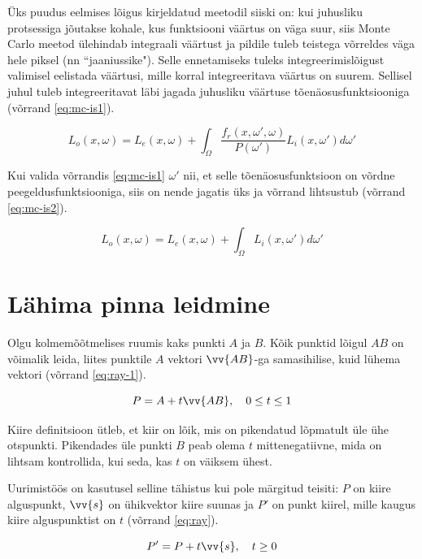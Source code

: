 \documentclass[a4paper,12pt]{report}
\renewcommand{\vec}[1]{\vv{#1}}
\begin{document}
Üks puudus eelmises lõigus kirjeldatud meetodil siiski on: kui juhusliku
protsessiga jõutakse kohale, kus funktsiooni väärtus on väga suur, siis
Monte Carlo meetod ülehindab integraali väärtust ja pildile tuleb teistega
võrreldes väga hele piksel (nn ``jaaniussike"). Selle ennetamiseks tuleks
integreerimislõigust valimisel eelistada väärtusi, mille korral
integreeritava väärtus on suurem. Sellisel juhul tuleb integreeritavat
läbi jagada juhusliku väärtuse tõenäosusfunktsiooniga (võrrand \ref{eq:mc-is1}).

\begin{equation} \label{eq:mc-is1}
L_o(x, \omega) = L_e(x, \omega) + \int_\Omega \frac{f_r(x, \omega', \omega)}{P(\omega')} L_i(x, \omega') d\omega'
\end{equation}

Kui valida võrrandis \ref{eq:mc-is1} \(\omega'\) nii, et selle
tõenäosusfunktsioon on võrdne peegeldus\-funktsiooniga, siis on nende
jagatis üks ja võrrand lihtsustub (võrrand \ref{eq:mc-is2}).

\begin{equation} \label{eq:mc-is2}
L_o(x, \omega) = L_e(x, \omega) + \int_\Omega L_i(x, \omega') d\omega'
\end{equation}

\section{Lähima pinna leidmine}
Olgu kolmemõõtmelises ruumis kaks punkti \(A\) ja \(B\). Kõik punktid
lõigul \(AB\) on võimalik leida, liites punktile \(A\) vektori \(\vec{AB}\)-ga
samasihilise, kuid lühema vektori (võrrand \ref{eq:ray-1}).

\begin{equation} \label{eq:ray-1}
P = A + t\vec{AB}, \quad 0 \leq t \leq 1
\end{equation}

Kiire definitsioon ütleb, et kiir on lõik, mis on pikendatud lõpmatult
üle ühe otspunkti. Pikendades üle punkti \(B\) peab olema \(t\)
mittenegatiivne, mida on lihtsam kontrollida, kui seda, kas \(t\) on
väiksem ühest.

Uurimistöös on kasutusel selline tähistus kui pole märgitud teisiti:
\(P\) on kiire alguspunkt, \(\vec s\) on ühikvektor kiire suunas ja
\(P'\) on punkt kiirel, mille kaugus kiire alguspunktist on \(t\)
(võrrand \ref{eq:ray}).

\begin{equation} \label{eq:ray}
P' = P + t\vec s, \quad t \geq 0
\end{equation}
\end{document}
